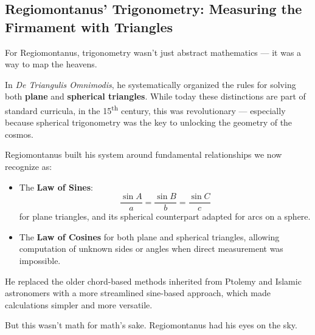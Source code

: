 \subsection{Regiomontanus’ Trigonometry: Measuring the Firmament with Triangles}

For Regiomontanus, trigonometry wasn’t just abstract mathematics — it was a way to map the heavens.

In \textit{De Triangulis Omnimodis}, he systematically organized the rules for solving both \textbf{plane} and \textbf{spherical triangles}. While today these distinctions are part of standard curricula, in the 15\textsuperscript{th} century, this was revolutionary — especially because spherical trigonometry was the key to unlocking the geometry of the cosmos.

Regiomontanus built his system around fundamental relationships we now recognize as:

\begin{itemize}
  \item The \textbf{Law of Sines}:
  \[
  \frac{\sin A}{a} = \frac{\sin B}{b} = \frac{\sin C}{c}
  \]
  for plane triangles, and its spherical counterpart adapted for arcs on a sphere.
  
  \item The \textbf{Law of Cosines} for both plane and spherical triangles, allowing computation of unknown sides or angles when direct measurement was impossible.
\end{itemize}

He replaced the older chord-based methods inherited from Ptolemy and Islamic astronomers with a more streamlined sine-based approach, which made calculations simpler and more versatile.

But this wasn’t math for math’s sake. Regiomontanus had his eyes on the sky.



